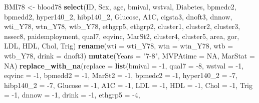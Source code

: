\documentclass[]{article}
\newenvironment{Shaded}{\begin{snugshade}}{\end{snugshade}}
\newcommand{\KeywordTok}[1]{\textcolor[rgb]{0.12,0.11,0.11}{\textbf{#1}}}
\newcommand{\DataTypeTok}[1]{\textcolor[rgb]{0.00,0.34,0.68}{#1}}
\newcommand{\DecValTok}[1]{\textcolor[rgb]{0.69,0.50,0.00}{#1}}
\newcommand{\StringTok}[1]{\textcolor[rgb]{0.75,0.01,0.01}{#1}}
\newcommand{\OtherTok}[1]{\textcolor[rgb]{0.00,0.43,0.16}{#1}}
\newcommand{\OperatorTok}[1]{\textcolor[rgb]{0.12,0.11,0.11}{#1}}
\newcommand{\NormalTok}[1]{\textcolor[rgb]{0.12,0.11,0.11}{#1}}
\begin{document}
\begin{Shaded}
\begin{Highlighting}[]
{{{{{{{{{{{{{{{{{{{{{{{{{{{{{{{{{{{{\NormalTok{BMI78 <-}\StringTok{ }\NormalTok{blood78 }\OperatorTok{%>%}\StringTok{ }
\StringTok{  }\KeywordTok{select}\NormalTok{(ID, Sex, age, bmival, wstval, Diabetes, bpmedc2, bpmedd2, }
\NormalTok{         hyper140_}\DecValTok{2}\NormalTok{, hibp140_}\DecValTok{2}\NormalTok{,  Glucose, A1C, cigsta3, dnoft3, }
\NormalTok{         dnnow, wti_Y78, wtn_Y78, wtb_Y78, ethgrp5, ethgrp2,}
\NormalTok{         cluster1, cluster2, cluster3, nssec8, paidemployment, }
\NormalTok{         qual7, eqvinc, MarSt2, cluster4, cluster5, area, gor, }
\NormalTok{         LDL, HDL, Chol, Trig) }\OperatorTok{%>%}\StringTok{ }
\StringTok{  }\KeywordTok{rename}\NormalTok{(}\DataTypeTok{wti =}\NormalTok{ wti_Y78, }\DataTypeTok{wtn =}\NormalTok{ wtn_Y78, }\DataTypeTok{wtb =}\NormalTok{ wtb_Y78, }
         \DataTypeTok{drink =}\NormalTok{ dnoft3) }\OperatorTok{%>%}\StringTok{ }
\StringTok{  }\KeywordTok{mutate}\NormalTok{(}\DataTypeTok{Years =} \StringTok{"7-8"}\NormalTok{, }\DataTypeTok{MVPAtime =} \OtherTok{NA}\NormalTok{, }\DataTypeTok{MarStat =} \OtherTok{NA}\NormalTok{) }\OperatorTok{%>%}\StringTok{ }
\StringTok{  }\KeywordTok{replace_with_na}\NormalTok{(}\DataTypeTok{replace =} \KeywordTok{list}\NormalTok{(}\DataTypeTok{bmival =} \OperatorTok{-}\DecValTok{1}\NormalTok{, }\DataTypeTok{qual7 =} \OperatorTok{-}\DecValTok{8}\NormalTok{,}
                                 \DataTypeTok{wstval =} \OperatorTok{-}\DecValTok{1}\NormalTok{, }\DataTypeTok{eqvinc =} \OperatorTok{-}\DecValTok{1}\NormalTok{,}
                                 \DataTypeTok{bpmedd2 =} \OperatorTok{-}\DecValTok{1}\NormalTok{, }\DataTypeTok{MarSt2 =} \OperatorTok{-}\DecValTok{1}\NormalTok{,}
                                 \DataTypeTok{bpmedc2 =} \OperatorTok{-}\DecValTok{1}\NormalTok{, }\DataTypeTok{hyper140_2 =} \OperatorTok{-}\DecValTok{7}\NormalTok{, }
                                 \DataTypeTok{hibp140_2 =} \OperatorTok{-}\DecValTok{7}\NormalTok{, }\DataTypeTok{Glucose =} \OperatorTok{-}\DecValTok{1}\NormalTok{, }
                                 \DataTypeTok{A1C  =} \OperatorTok{-}\DecValTok{1}\NormalTok{,  }\DataTypeTok{LDL =} \OperatorTok{-}\DecValTok{1}\NormalTok{, }\DataTypeTok{HDL =} \OperatorTok{-}\DecValTok{1}\NormalTok{, }
                                 \DataTypeTok{Chol =} \OperatorTok{-}\DecValTok{1}\NormalTok{, }\DataTypeTok{Trig =} \OperatorTok{-}\DecValTok{1}\NormalTok{, }\DataTypeTok{dnnow =} \OperatorTok{-}\DecValTok{1}\NormalTok{,}
                                 \DataTypeTok{drink =} \OperatorTok{-}\DecValTok{1}\NormalTok{, }\DataTypeTok{ethgrp5 =} \OperatorTok{-}\DecValTok{4}\NormalTok{, }
}}}}}}}}}}}}}}}}}}}}}}}}}}}}}}}}}}}}}}}}
\end{Highlighting}
\end{Shaded}
\end{document}
